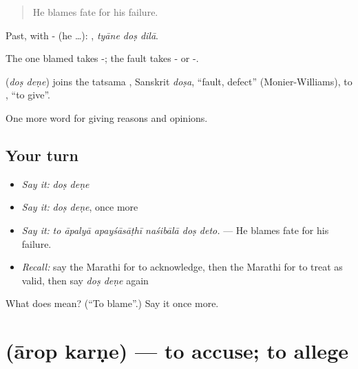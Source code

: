 \begin{quote}
He blames fate for his failure.
\end{quote}

Past, with - (he …):   , \emph{tyāne doṣ dilā}.

The one blamed takes -; the fault takes - or -.

\begin{cousinweb}
\textbf{ } (\emph{doṣ deṇe}) joins the tatsama , Sanskrit \emph{doṣa}, \textquotedblleft{}fault, defect\textquotedblright{} (Monier-Williams), to , \textquotedblleft{}to give\textquotedblright{}.
\end{cousinweb}

\begin{grammarlens}[title={What you've built}]
One more word for giving reasons and opinions.
\end{grammarlens}

\subsection*{Your turn}
\begin{itemize}
\raggedright
  \item \emph{Say it:} \emph{doṣ deṇe}
  \item \emph{Say it:} \emph{doṣ deṇe}, once more
  \item \emph{Say it:} \emph{to āpalyā apayśāsāṭhī naśibālā doṣ deto.} — He blames fate for his failure.
  \item \emph{Recall:} say the Marathi for to acknowledge, then the Marathi for to treat as valid, then say \emph{doṣ deṇe} again
\end{itemize}

\begin{tcolorbox}[breakable,colback=teal!4,colframe=teal!35!black,title={Before you move on}]
What does   mean? (\textquotedblleft{}To blame\textquotedblright{}.) Say it once more.
\end{tcolorbox}
\section[\texorpdfstring{\mr{आरोप} \mr{करणे} (ārop karṇe)}{आरोप करणे (ārop karṇe)}]{  (ārop karṇe) — to accuse; to allege}

\label{lesson:MR-C350-arop-karne}



